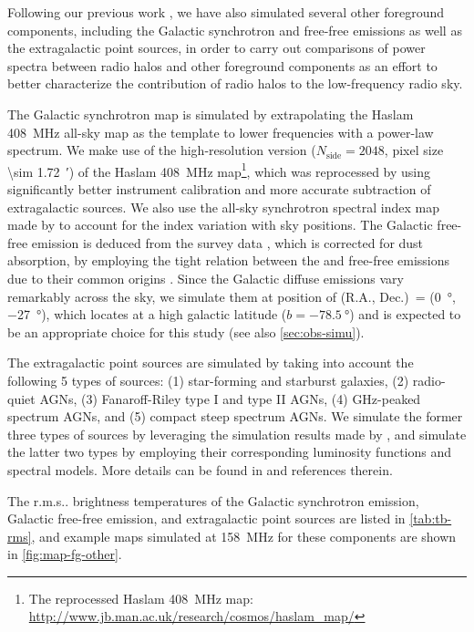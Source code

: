 \documentclass[modern]{aastex62}
\makeatletter
\newcommand{\R}[1]{\mathrm{#1}}
\newcommand{\Halpha}{\text{H$\alpha$}}
\newcommand{\rms}{r.m.s\@ifnextchar.{}{.\@}}
\makeatother
\begin{document}
Following our previous work \citep{wang2010}, we have also simulated
several other foreground components, including the Galactic synchrotron
and free-free emissions as well as the extragalactic point sources,
in order to carry out comparisons of power spectra between radio halos
and other foreground components as an effort to better characterize the
contribution of radio halos to the low-frequency radio sky.

The Galactic synchrotron map is simulated by extrapolating the
Haslam \SI{408}{\MHz} all-sky map as the template to lower frequencies
with a power-law spectrum.
We make use of the high-resolution version ($N_{\R{side}} = 2048$,
pixel size \SI{\sim 1.72}{\arcminute}) of the Haslam \SI{408}{\MHz}
map\footnote{The reprocessed Haslam \SI{408}{\MHz} map:
  \url{http://www.jb.man.ac.uk/research/cosmos/haslam_map/}},
which was reprocessed by \citet{remazeilles2015} using significantly
better instrument calibration and more accurate subtraction of
extragalactic sources.
We also use the all-sky synchrotron spectral index map made by
\citet{giardino2002} to account for the index variation with sky positions.
The Galactic free-free emission is deduced from the \Halpha{} survey
data \citep{finkbeiner2003}, which is corrected for dust absorption,
by employing the tight relation between the \Halpha{} and free-free
emissions due to their common origins
\citep[see][and references therein]{dickinson2003}.
Since the Galactic diffuse emissions vary remarkably across the sky,
we simulate them at position of
(R.A., Dec.)\ = (\SI{0}{\degree}, \SI{-27}{\degree}), which locates at a
high galactic latitude ($b = \SI{-78.5}{\degree}$) and is expected to be
an appropriate choice for this study (see also \autoref{sec:obs-simu}).

The extragalactic point sources are simulated by taking into account the
following 5 types of sources: (1) star-forming and starburst galaxies,
(2) radio-quiet AGNs, (3) Fanaroff-Riley type I and type II AGNs,
(4) GHz-peaked spectrum AGNs, and (5) compact steep spectrum AGNs.
We simulate the former three types of sources by leveraging the simulation
results made by \citet{wilman2008}, and simulate the latter two types
by employing their corresponding luminosity functions and spectral models.
More details can be found in \citet{wang2010} and references therein.

The \rms{} brightness temperatures of the Galactic synchrotron emission,
Galactic free-free emission, and extragalactic point sources are listed
in \autoref{tab:tb-rms}, and example maps simulated at \SI{158}{\MHz}
for these components are shown in \autoref{fig:map-fg-other}.
\end{document}
